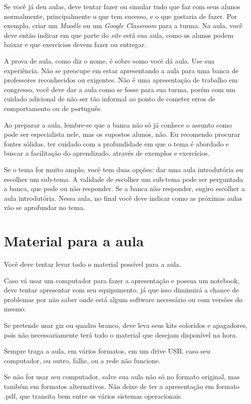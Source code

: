 \documentclass{article}
\begin{document}
Se você já deu aulas, deve tentar fazer ou simular tudo que faz com seus alunos normalmente, principalmente o que tem sucesso, e o que gostaria de fazer. Por exemplo, criar um \textit{Moodle} ou um \textit{Google Classroom} para a turma. Na aula, você deve então indicar em que parte do \textit{site} está sua aula, como os alunos podem baixar e que exercícios devem fazer ou entregar.

A prova de aula, como diz o nome, é sobre como você dá aula. Use sua experiência. Não se preocupe em estar apresentando a aula para uma banca de professores reconhecidos ou exigentes. Não é uma apresentação de trabalho em congresso, você deve dar a aula  como se fosse para sua turma, porém com um cuidado adicional de não ser tão informal ao ponto de cometer erros de comportamento ou de português.

Ao preparar a aula, lembre-se que a banca não só já conhece o assunto como pode ser especialista nele, mas os supostos alunos, não. Eu recomendo procurar fontes sólidas, ter cuidado com a profundidade em que o tema é abordado e buscar a facilitação do aprendizado, através de exemplos e exercícios. 

Se o tema for muito amplo, você tem duas opções: dar uma aula introdutória ou escolher um sub-tema. A validade de escolher um sub-tema pode ser perguntada a banca, que pode ou não responder. Se a banca não responder, sugiro escolher a aula introdutória. Nessa aula, no final você deve indicar como as próximas aulas vão se aprofundar no tema.

\section{Material para a aula}

Você deve tentar levar todo o material possível para a aula.

Caso vá usar um computador para fazer a apresentação e possua um notebook, deve tentar apresentar com seu equipamento, já que isso diminuirá a chance de problemas por não saber onde está algum software necessário ou com versões do mesmo.

Se pretende usar giz ou quadro branco, deve leva seus kits coloridos e apagadores, pois não necessariamente terá todo o material que desejam disponível na hora.

Sempre traga a aula, em vários formatos, em um drive USB, caso seu computador, ou outro, falhe, ou a rede não funcione.

Se não for usar seu computador, salve sua aula não só no formato original, mas também em formatos alternativos. Não deixe de ter a apresentação em formato .pdf, que transita bem entre os vários sistemas operacionais.
\end{document}
